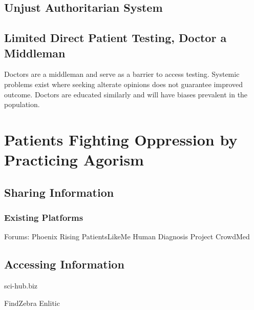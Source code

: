 \documentclass{article}
\begin{document}
\subsection{Unjust Authoritarian System}


\subsection{Limited Direct Patient Testing, Doctor a Middleman}

Doctors are a middleman and serve as a barrier to access testing. Systemic problems exist where seeking alterate opinions does not guarantee improved outcome. Doctors are educated similarly and will have biases prevalent in the population. 



\cite{CarsonDesktop}

\section{Patients Fighting Oppression by Practicing Agorism}

\subsection{Sharing Information}




\subsubsection{Existing Platforms}
Forums: Phoenix Rising
PatientsLikeMe
Human Diagnosis Project
CrowdMed

\subsection{Accessing Information}
sci-hub.biz


FindZebra
Enlitic

\cite{scholz2016platform}

\end{document}
